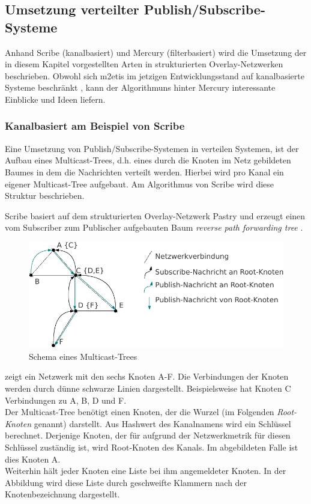 \subsection{Umsetzung verteilter Publish/Subscribe-Systeme}
Anhand Scribe (kanalbasiert) \cite{Castro2002Scribe} und Mercury (filterbasiert) \cite{Bharambe2004Mercury} wird die Umsetzung der in diesem Kapitel vorgestellten Arten in strukturierten Overlay-Netzwerken beschrieben. Obwohl sich \ac{m2etis} im jetzigen Entwicklungsstand auf kanalbasierte Systeme beschränkt \cite{Fischer2010a}, kann der Algorithmuns hinter Mercury interessante Einblicke und Ideen liefern.

\subsubsection*{Kanalbasiert am Beispiel von Scribe}
\label{chap:related:scribe}
Eine Umsetzung von Publish/Subscribe-Systemen in verteilen Systemen, ist der Aufbau eines Multicast-Trees, d.h. eines durch die Knoten im Netz gebildeten Baumes in dem die Nachrichten verteilt werden. Hierbei wird pro Kanal ein eigener Multicast-Tree aufgebaut. Am Algorithmus von Scribe wird diese Struktur beschrieben.

Scribe basiert auf dem strukturierten Overlay-Netzwerk Pastry \cite{Rowstron2001} und erzeugt einen vom Subscriber zum Publischer aufgebauten Baum \emph{reverse path forwarding tree} \cite{Dalal1978}.

\begin{figure}[htbp]
\centering
\includegraphics{grafics/multicast_tree.pdf}
\caption{Schema eines Multicast-Trees}
\label{fig:multicast_tree}
\end{figure}

 zeigt ein Netzwerk mit den sechs Knoten A-F. Die Verbindungen der Knoten werden durch dünne schwarze Linien dargestellt. Beispielsweise hat Knoten C Verbindungen zu A, B, D und F.\\
Der Multicast-Tree benötigt einen Knoten, der die Wurzel (im Folgenden \emph{Root-Knoten} genannt) darstellt. Aus Hashwert des Kanalnamens wird ein Schlüssel berechnet. Derjenige Knoten, der für aufgrund der Netzwerkmetrik für diesen Schlüssel zuständig ist, wird Root-Knoten des Kanals. Im abgebildeten Falle ist dies Knoten A.\\
Weiterhin hält jeder Knoten eine Liste bei ihm angemeldeter Knoten. In der Abbildung wird diese Liste durch geschweifte Klammern nach der Knotenbezeichnung dargestellt.

